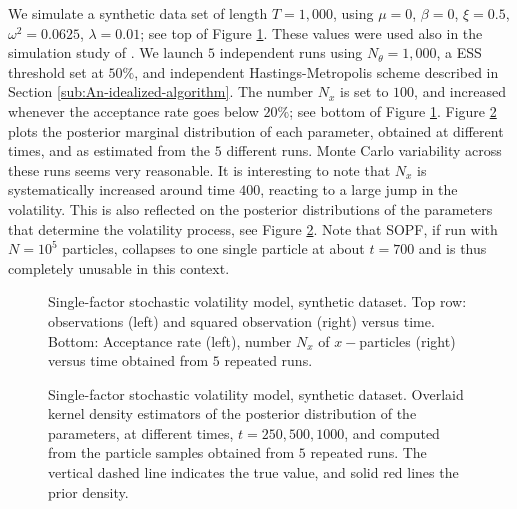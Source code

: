 \documentclass{statsoc}
\begin{document}
We simulate a synthetic data set of length $T = 1,000$, using 
$\mu = 0$, $\beta = 0$, $\xi = 0.5$, $\omega^2 = 0.0625$,
$\lambda = 0.01$; see top of Figure
\ref{fig:SVonefactor:observations}. These values were used also in the
simulation study of \cite{bns:real}. 
We launch $5$ independent runs using $N_\theta = 1,000$, a 
 ESS threshold set at $50\%$, and independent Hastings-Metropolis scheme
described in Section \ref{sub:An-idealized-algorithm}. The number $N_x$ is set to $100$, and 
increased whenever the acceptance rate goes below $20\%$; 
see bottom of Figure \ref{fig:SVonefactor:observations}.
Figure 
\ref{fig:SVonefactor:Concentration} plots
the posterior marginal distribution of each parameter,
obtained at different times, and as estimated from the 
$5$ different runs. Monte Carlo variability across these runs 
seems very reasonable.  It is interesting to note that 
$N_x$ is systematically increased around time $400$, 
reacting to a large jump in the volatility. This is also reflected on
the posterior distributions of the parameters that determine the
volatility process, see  Figure
\ref{fig:SVonefactor:Concentration}. 
Note that SOPF, if run with $N=10^5$ particles,
collapses to one single particle at about $t=700$ and is thus
completely unusable in this context. 

\begin{figure}[H]
 \centering
 \caption{\label{fig:SVonefactor:observations} Single-factor stochastic volatility model, synthetic dataset.
Top row: observations (left) and squared observation (right) versus time. Bottom: Acceptance rate (left), number $N_x$
of $x-$particles (right) versus time obtained from $5$ repeated runs.
 }
\end{figure}


\begin{figure}[H]
 \centering
 \caption{\label{fig:SVonefactor:Concentration} 
 Single-factor stochastic volatility model, synthetic dataset.
Overlaid kernel density estimators of the posterior distribution of the parameters,
at different times, $t=250,500,1000$, and  
computed from the particle samples obtained from $5$ repeated runs. 
The vertical dashed line indicates the true value, and solid red lines
the prior density. }
\end{figure}
\end{document}
